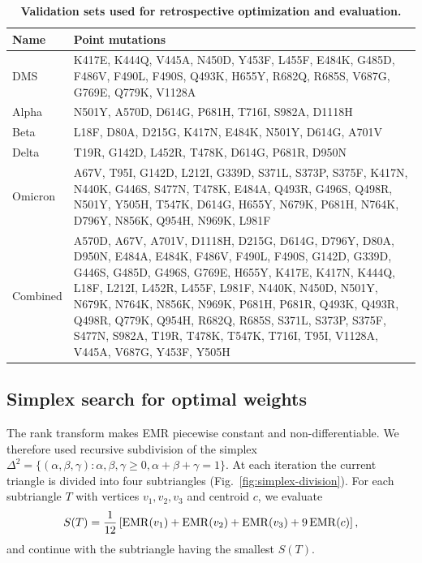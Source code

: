 \documentclass{article}
\numberwithin{theorem}{section}
\begin{document}
\begin{table}[htbp]
    \centering
    \caption{\textbf{Validation sets used for retrospective optimization and evaluation.}}
    \begin{tabular}{l|p{}}
    \toprule
    \textbf{Name} & \textbf{Point mutations} \\
    \midrule
    DMS &
    \ttfamily K417E, K444Q, V445A, N450D, Y453F, L455F, E484K, G485D, F486V, F490L, F490S, Q493K, H655Y, R682Q, R685S, V687G, G769E, Q779K, V1128A \\
    \midrule
    Alpha &
    \ttfamily N501Y, A570D, D614G, P681H, T716I, S982A, D1118H \\
    \midrule
    Beta &
    \ttfamily L18F, D80A, D215G, K417N, E484K, N501Y, D614G, A701V \\
    \midrule
    Delta &
    \ttfamily T19R, G142D, L452R, T478K, D614G, P681R, D950N \\
    \midrule
    Omicron &
    \ttfamily A67V, T95I, G142D, L212I, G339D, S371L, S373P, S375F, K417N, N440K, G446S, S477N, T478K, E484A, Q493R, G496S, Q498R, N501Y, Y505H, T547K, D614G, H655Y, N679K, P681H, N764K, D796Y, N856K, Q954H, N969K, L981F \\
    \midrule
    Combined &
    \ttfamily A570D, A67V, A701V, D1118H, D215G, D614G, D796Y, D80A, D950N, E484A, E484K, F486V, F490L, F490S, G142D, G339D, G446S, G485D, G496S, G769E, H655Y, K417E, K417N, K444Q, L18F, L212I, L452R, L455F, L981F, N440K, N450D, N501Y, N679K, N764K, N856K, N969K, P681H, P681R, Q493K, Q493R, Q498R, Q779K, Q954H, R682Q, R685S, S371L, S373P, S375F, S477N, S982A, T19R, T478K, T547K, T716I, T95I, V1128A, V445A, V687G, Y453F, Y505H \\
    \bottomrule
    \end{tabular}
    \label{tab:validation-sets}
\end{table}

\subsection{Simplex search for optimal weights}

The rank transform makes EMR piecewise constant and non-differentiable. We
therefore used recursive subdivision of the simplex
$\Delta^2=\{(\alpha,\beta,\gamma):\alpha,\beta,\gamma\geq0,\alpha+\beta+\gamma=1\}$.
At each iteration the current triangle is divided into four subtriangles
(Fig.~\ref{fig:simplex-division}). For each subtriangle $T$ with vertices
$v_1,v_2,v_3$ and centroid $c$, we evaluate
\begin{equation}
    S(T)=\frac{1}{12}\left[
    {\rm EMR}(v_1)+{\rm EMR}(v_2)+{\rm EMR}(v_3)+9\,{\rm EMR}(c)
    \right],
\end{equation}
and continue with the subtriangle having the smallest $S(T)$.
\end{document}
